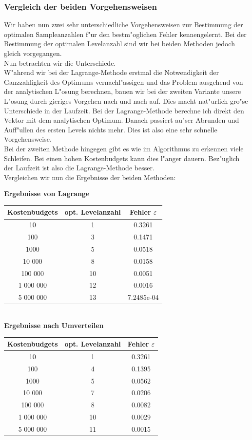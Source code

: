 \subsubsection{Vergleich der beiden Vorgehensweisen}
Wir haben nun zwei sehr unterschiedliche Vorgehensweisen zur Bestimmung der optimalen Sampleanzahlen f"ur den bestm"oglichen Fehler kennengelernt. Bei der Bestimmung der optimalen Levelanzahl sind wir bei beiden Methoden jedoch gleich vorgegangen.\\[0,2cm]
Nun betrachten wir die Unterschiede.\\
W"ahrend wir bei der Lagrange-Methode erstmal die Notwendigkeit der Ganzzahligkeit des Optimums vernachl"assigen und das Problem ausgehend von der analytischen L"osung berechnen, bauen wir bei der zweiten Variante unsere L"osung durch gieriges Vorgehen nach und nach auf. Dies macht nat"urlich gro"se Unterschiede in der Laufzeit.
Bei der Lagrange-Methode berechne ich direkt den Vektor mit dem analytischen Optimum. Danach passiert au"ser Abrunden und Auff"ullen des ersten Levels nichts mehr. Dies ist also eine sehr schnelle Vorgehensweise.\\
Bei der zweiten Methode hingegen gibt es wie im Algorithmus zu erkennen viele Schleifen. Bei einen hohen Kostenbudgets kann dies l"anger dauern. Bez"uglich der Laufzeit ist also die Lagrange-Methode besser.\\[0,2cm]
Vergleichen wir nun die Ergebnisse der beiden Methoden:
\begin{center}
\textbf{Ergebnisse von Lagrange}\\[0,1cm]
\begin{tabular}{|c|c|c|}
Kostenbudgets & opt. Levelanzahl & Fehler $\varepsilon$ \\
 \hline
10 & 1 & 0.3261 \\
\hline
100& 3 & 0.1471 \\
\hline
1000& 5 &  0.0518 \\
\hline
10 000& 8 & 0.0158 \\
\hline
100 000& 10 & 0.0051 \\
\hline
1 000 000& 12 &  0.0016 \\
\hline
5 000 000& 13 & 7.2485e-04
 \\
\end{tabular}\\[0,5cm]
\textbf{Ergebnisse nach Umverteilen}\\[0,1cm]
\begin{tabular}{|c|c|c|}
Kostenbudgets & opt. Levelanzahl & Fehler $\varepsilon$ \\
 \hline
10 & 1 & 0.3261 \\
\hline
100& 4 & 0.1395 \\
\hline
1000& 5 &  0.0562 \\
\hline
10 000& 7 & 0.0206 \\
\hline
100 000& 8 & 0.0082 \\
\hline
1 000 000& 10 &   0.0029 \\
\hline
5 000 000& 11 & 0.0015
 \\
\end{tabular}
\end{center}\vspace{0,2cm}
